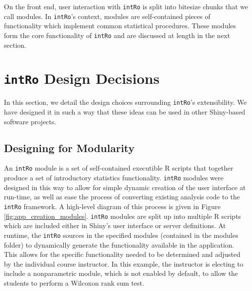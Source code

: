 \documentclass[12pt,]{article}
\begin{document}
On the front end, user interaction with \texttt{intRo} is split into
bitesize chunks that we call modules. In \texttt{intRo}'s context,
modules are self-contained pieces of functionality which implement
common statistical procedures. These modules form the core functionality
of \texttt{intRo} and are discussed at length in the next section.

\section{\texorpdfstring{\texttt{intRo} Design
Decisions}{intRo Design Decisions}}\label{intro-design-decisions}

In this section, we detail the design choices surrounding
\texttt{intRo}'s extensibility. We have designed it in such a way that
these ideas can be used in other Shiny-based software projects.

\subsection{Designing for Modularity}\label{designing-for-modularity}

An \texttt{intRo} module is a set of self-contained executible R scripts
that together produce a set of introductory statistics functionality.
\texttt{intRo} modules were designed in this way to allow for simple
dynamic creation of the user interface at run-time, as well as ease the
process of converting existing analysis code to the \texttt{intRo}
framework. A high-level diagram of this process is given in Figure
\ref{fig:app_creation_modules}. \texttt{intRo} modules are split up into
multiple R scripts which are included either in Shiny's user interface
or server definitions. At runtime, the \texttt{intRo} sources in the
specified modules (contained in the modules folder) to dynamically
generate the functionality available in the application. This allows for
the specific functionality needed to be determined and adjusted by the
individual course instructor. In this example, the instructor is
electing to include a nonparametric module, which is not enabled by
default, to allow the students to perform a Wilcoxon rank sum test.
\end{document}
